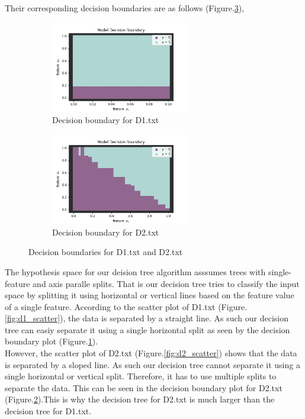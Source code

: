 \documentclass[a4paper]{article}
\theoremstyle{definition}
\newenvironment{soln}{
    \leavevmode\color{blue}\ignorespaces
}{}
\begin{document}
\begin{enumerate}
\begin{soln}
Their corresponding decision boundaries are as follows (Figure.\ref{fig:q2_8}),
\begin{figure}[H]
  \centering
  \begin{subfigure}[b]{0.3\textwidth}
      \centering
      \includegraphics[width=6cm]{d1_vis_decision_boundary.png}
      \caption{Decision boundary for D1.txt}
      \label{fig:d1_vis}
  \end{subfigure}
  \begin{subfigure}[b]{0.3\textwidth}
      \centering
      \includegraphics[width=6cm]{d2_vis_decision_boundary.png}
      \caption{Decision boundary for D2.txt}
      \label{fig:d2_vis}
  \end{subfigure}
  \caption{Decision boundaries for D1.txt and D2.txt}
  \label{fig:q2_8}
\end{figure}

The hypothesis space for our deision tree algorithm asssumes trees with single-feature and axis paralle splits. That is our decision tree tries to classify the input space by splitting it using horizontal or vertical lines based on the feature value of a single feature. According to the scatter plot of D1.txt (Figure.\ref{fig:d1_scatter}), the data is separated by a straight line. As such our decision tree can easiy separate it using a single horizontal split as seen by the decision boundary plot (Figure.\ref*{fig:d1_vis}). \\

However, the scatter plot of D2.txt (Figure.\ref{fig:d2_scatter}) shows that the data is separated by a sloped line. As such our decision tree cannot separate it using a single horizontal or vertical split. Therefore, it has to use multiple splits to separate the data. This can be seen in the decision boundary plot for D2.txt (Figure.\ref{fig:d2_vis}).This is why the decision tree for D2.txt is much larger than the decision tree for D1.txt. \\


\end{soln}
\end{enumerate}
\end{document}
